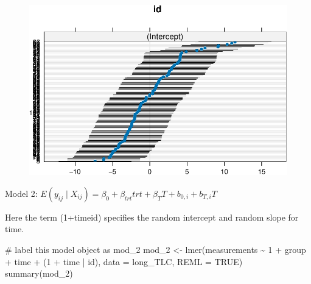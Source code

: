 \documentclass[
  letterpaper,
  DIV=11,
  numbers=noendperiod]{scrreprt}
\newenvironment{Shaded}{\begin{snugshade}}{\end{snugshade}}
\newcommand{\AttributeTok}[1]{\textcolor[rgb]{0.40,0.45,0.13}{#1}}
\newcommand{\CommentTok}[1]{\textcolor[rgb]{0.37,0.37,0.37}{#1}}
\newcommand{\ConstantTok}[1]{\textcolor[rgb]{0.56,0.35,0.01}{#1}}
\newcommand{\DecValTok}[1]{\textcolor[rgb]{0.68,0.00,0.00}{#1}}
\newcommand{\FunctionTok}[1]{\textcolor[rgb]{0.28,0.35,0.67}{#1}}
\newcommand{\NormalTok}[1]{\textcolor[rgb]{0.00,0.23,0.31}{#1}}
\newcommand{\OtherTok}[1]{\textcolor[rgb]{0.00,0.23,0.31}{#1}}
\newcommand{\SpecialCharTok}[1]{\textcolor[rgb]{0.37,0.37,0.37}{#1}}
\begin{document}
\begin{figure}[H]

{\centering \includegraphics{Longi_mixeffect_files/figure-pdf/unnamed-chunk-8-1.pdf}

}

\end{figure}

\begin{center}
Model 2: $E(y_{ij} \mid X_{ij}) = \beta_0 +  \beta_{trt}trt +  \beta_{T}T + b_{0,i} + b_{T,i}T$
\end{center}

Here the term (1+time\textbar id) specifies the random intercept and
random slope for time.

\begin{Shaded}
\begin{Highlighting}[]
\CommentTok{\# label this model object as mod\_2}
\NormalTok{mod\_2 }\OtherTok{\textless{}{-}} \FunctionTok{lmer}\NormalTok{(measurements }\SpecialCharTok{\textasciitilde{}} \DecValTok{1} \SpecialCharTok{+}\NormalTok{ group }\SpecialCharTok{+}\NormalTok{ time }\SpecialCharTok{+}\NormalTok{ (}\DecValTok{1} \SpecialCharTok{+}\NormalTok{ time }\SpecialCharTok{|}\NormalTok{ id), }\AttributeTok{data =}\NormalTok{ long\_TLC,}
    \AttributeTok{REML =} \ConstantTok{TRUE}\NormalTok{)}
\FunctionTok{summary}\NormalTok{(mod\_2)}
\end{Highlighting}
\end{Shaded}
\end{document}
